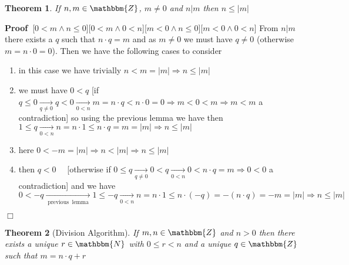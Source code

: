 \documentclass{book}
\newcommand{\Rightarrowlim}{\mathop{\rightarrow}\limits}
\newcommand{\tmop}[1]{\ensuremath{\operatorname{#1}}}
\newcommand{\um}{-}
\newcommand{\upl}{+}
\newenvironment{proof}{\noindent\textbf{Proof\ }}{\hspace*{\fill}$\Box$\medskip}
\newtheorem{theorem}{Theorem}
\begin{document}
{{\begin{theorem}
  \label{n|m=<gtr>n<less>=|m|}If $n, m \in \mathbbm{Z}$, $m \neq 0$ and $n|m$
  then $n \leqslant | m |$
\end{theorem}

\begin{proof}[$0 < m \wedge n \leqslant 0$][$0 < m \wedge 0 < n$][$m < 0
\wedge n \leqslant 0$][$m < 0 \wedge 0 < n$]
  From $n|m$ there exists a $q$ such that $n \cdot q = m$ and as $m \neq 0$ we
  must have $q \neq 0$ (otherwise $m = n \cdot 0 = 0$). Then we have the
  following cases to consider
  \begin{enumerate}
    \item in this case we have trivially $n < m = | m | \Rightarrow n
    \leqslant | m |$
    
    \item we must have $0 < q$ [if $q \leqslant 0 \Rightarrowlim_{q \neq 0} q
    < 0 \Rightarrowlim_{0 < n} m = n \cdot q < n \cdot 0 = 0 \Rightarrow m < 0
    < m \Rightarrow m < m$ a contradiction] so using the previous lemma we
    have then $1 \leqslant q \Rightarrowlim_{0 < n} n = n \cdot 1 \leqslant n
    \cdot q = m = | m | \Rightarrow n \leqslant | m |$
    
    \item here $0 < \um m = | m | \Rightarrow n < | m | \Rightarrow n
    \leqslant | m |$
    
    \item then $q < 0$ \ \ [otherwise if $0 \leqslant q \Rightarrowlim_{q \neq
    0} 0 < q \Rightarrowlim_{0 < n} 0 < n \cdot q = m \Rightarrow 0 < 0$ a
    contradiction] and we have $0 < \um q \Rightarrowlim_{\tmop{previous}
    \tmop{lemma}} 1 \leqslant \um q \Rightarrowlim_{0 < n} n = n \cdot 1
    \leqslant n \cdot (- q) = - (n \cdot q) = \um m = | m | \Rightarrow n
    \leqslant | m |$
  \end{enumerate}
\end{proof}



\begin{theorem}[Division Algorithm]
  \label{division algorithm}{}If $m, n \in
  \mathbbm{Z}$ and $n > 0$ then there exists a unique $r \in \mathbbm{N}$ with
  $0 \leqslant r < n$ and a unique $q \in \mathbbm{Z}$ such that $m = n \cdot
  q \upl r$
\end{theorem}

}}
\end{document}
